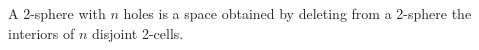 A 2-sphere with $n$ holes is a space obtained by deleting from a 2-sphere the interiors of $n$ disjoint 2-cells.
